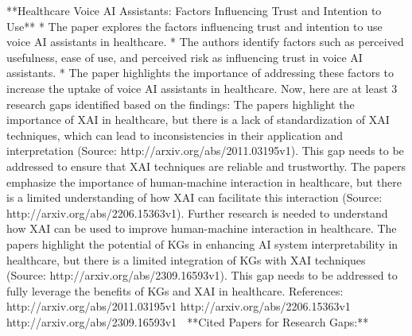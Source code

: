 \documentclass{article}%
\begin{document}
**Healthcare Voice AI Assistants: Factors Influencing Trust and Intention to Use**\newline%
\newline%
* The paper explores the factors influencing trust and intention to use voice AI assistants in healthcare.\newline%
* The authors identify factors such as perceived usefulness, ease of use, and perceived risk as influencing trust in voice AI assistants.\newline%
* The paper highlights the importance of addressing these factors to increase the uptake of voice AI assistants in healthcare.\newline%
\newline%
Now, here are at least 3 research gaps identified based on the findings:\newline%
\newline%
The papers highlight the importance of XAI in healthcare, but there is a lack of standardization of XAI techniques, which can lead to inconsistencies in their application and interpretation (Source: http://arxiv.org/abs/2011.03195v1). This gap needs to be addressed to ensure that XAI techniques are reliable and trustworthy.\newline%
\newline%
The papers emphasize the importance of human{-}machine interaction in healthcare, but there is a limited understanding of how XAI can facilitate this interaction (Source: http://arxiv.org/abs/2206.15363v1). Further research is needed to understand how XAI can be used to improve human{-}machine interaction in healthcare.\newline%
\newline%
The papers highlight the potential of KGs in enhancing AI system interpretability in healthcare, but there is a limited integration of KGs with XAI techniques (Source: http://arxiv.org/abs/2309.16593v1). This gap needs to be addressed to fully leverage the benefits of KGs and XAI in healthcare.\newline%
\newline%
References:\newline%
http://arxiv.org/abs/2011.03195v1\newline%
http://arxiv.org/abs/2206.15363v1\newline%
http://arxiv.org/abs/2309.16593v1\newline%
\newline%
\newline%
📌 **Cited Papers for Research Gaps:**\newline%
\end{document}
